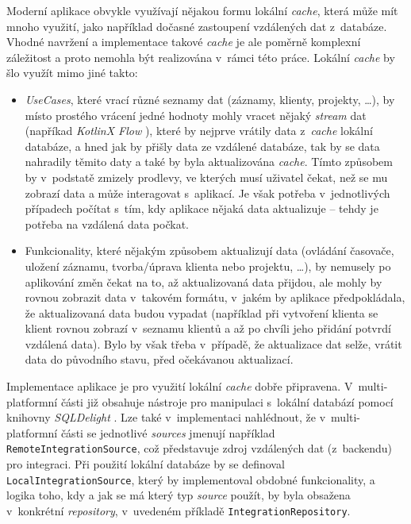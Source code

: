 Moderní aplikace obvykle využívají nějakou formu lokální \emph{cache}, která může mít mnoho využití, jako například dočasné zastoupení vzdálených dat z~databáze. Vhodné navržení a implementace takové \emph{cache} je ale poměrně komplexní záležitost a proto nemohla být realizována v~rámci této práce. Lokální \emph{cache} by šlo využít mimo jiné takto:
\begin{itemize}
\item{\emph{UseCases}, které vrací různé seznamy dat (záznamy, klienty, projekty, \dots), by místo prostého vrácení jedné hodnoty mohly vracet nějaký \emph{stream} dat (napříkad \emph{KotlinX Flow} \cite{kotlinx-flow}), které by nejprve vrátily data z~\emph{cache} lokální databáze, a hned jak by přišly data ze vzdálené databáze, tak by se data nahradily těmito daty a také by byla aktualizována \emph{cache}. Tímto způsobem by v~podstatě zmizely prodlevy, ve kterých musí uživatel čekat, než se mu zobrazí data a může interagovat s~aplikací. Je však potřeba v~jednotlivých případech počítat s~tím, kdy aplikace nějaká data aktualizuje – tehdy je potřeba na vzdálená data počkat.}
\item{Funkcionality, které nějakým způsobem aktualizují data (ovládání časovače, uložení záznamu, tvorba/úprava klienta nebo projektu, \dots), by nemusely po aplikování změn čekat na to, až aktualizovaná data přijdou, ale mohly by rovnou zobrazit data v~takovém formátu, v~jakém by aplikace předpokládala, že aktualizovaná data budou vypadat (například při vytvoření klienta se klient rovnou zobrazí v~seznamu klientů a až po chvíli jeho přidání potvrdí vzdálená data). Bylo by však třeba v~případě, že aktualizace dat selže, vrátit data do původního stavu, před očekávanou aktualizací.}
\end{itemize}

Implementace aplikace je pro využití lokální \emph{cache} dobře připravena. V~multi-platformní části již obsahuje nástroje pro manipulaci s~lokální databází pomocí knihovny \emph{SQLDelight} \cite{sqldelight}. Lze také v~implementaci nahlédnout, že v~multi-platformní části se jednotlivé \emph{sources} jmenují například \texttt{RemoteIntegrationSource}, což představuje zdroj vzdálených dat (z~backendu) pro integraci. Při použití lokální databáze by se definoval \texttt{LocalIntegrationSource}, který by implementoval obdobné funkcionality, a logika toho, kdy a jak se má který typ \emph{source} použít, by byla obsažena v~konkrétní \emph{repository}, v~uvedeném příkladě \texttt{IntegrationRepository}.

